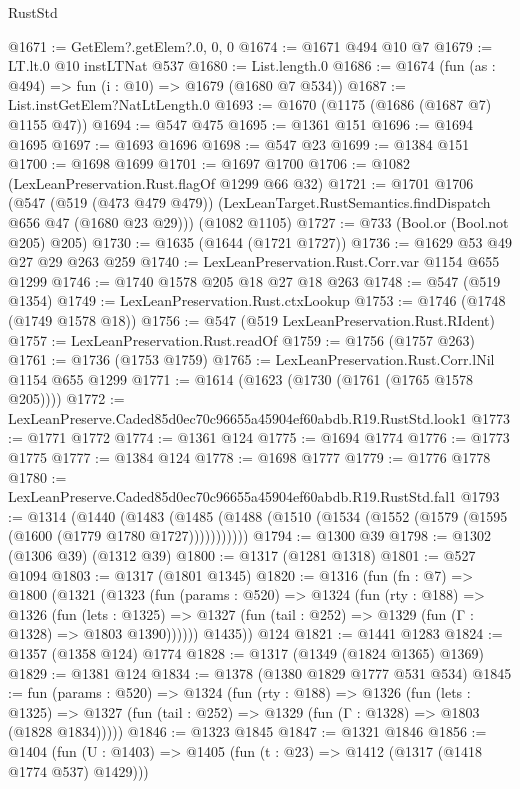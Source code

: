 \begin{lexlean}{RustStd}
\begin{coremodule}
@1671 := GetElem?.getElem?.{0, 0, 0}
@1674 := @1671 @494 @10 @7
@1679 := LT.lt.{0} @10 instLTNat @537
@1680 := List.length.{0}
@1686 := @1674 (fun (as : @494) => fun (i : @10) => @1679 (@1680 @7 @534))
@1687 := List.instGetElem?NatLtLength.{0}
@1693 := @1670 (@1175 (@1686 (@1687 @7) @1155 @47))
@1694 := @547 @475
@1695 := @1361 @151
@1696 := @1694 @1695
@1697 := @1693 @1696
@1698 := @547 @23
@1699 := @1384 @151
@1700 := @1698 @1699
@1701 := @1697 @1700
@1706 := @1082 (LexLeanPreservation.Rust.flagOf @1299 @66 @32)
@1721 := @1701
    @1706
    (@547
      (@519 (@473 @479 @479))
      (LexLeanTarget.RustSemantics.findDispatch @656 @47 (@1680 @23 @29)))
    (@1082 @1105)
@1727 := @733 (Bool.or (Bool.not @205) @205)
@1730 := @1635 (@1644 (@1721 @1727))
@1736 := @1629 @53 @49 @27 @29 @263 @259
@1740 := LexLeanPreservation.Rust.Corr.var @1154 @655 @1299
@1746 := @1740 @1578 @205 @18 @27 @18 @263
@1748 := @547 (@519 @1354)
@1749 := LexLeanPreservation.Rust.ctxLookup
@1753 := @1746 (@1748 (@1749 @1578 @18))
@1756 := @547 (@519 LexLeanPreservation.Rust.RIdent)
@1757 := LexLeanPreservation.Rust.readOf
@1759 := @1756 (@1757 @263)
@1761 := @1736 (@1753 @1759)
@1765 := LexLeanPreservation.Rust.Corr.lNil @1154 @655 @1299
@1771 := @1614 (@1623 (@1730 (@1761 (@1765 @1578 @205))))
@1772 := LexLeanPreserve.Caded85d0ec70c96655a45904ef60abdb.R19.RustStd.look1
@1773 := @1771 @1772
@1774 := @1361 @124
@1775 := @1694 @1774
@1776 := @1773 @1775
@1777 := @1384 @124
@1778 := @1698 @1777
@1779 := @1776 @1778
@1780 := LexLeanPreserve.Caded85d0ec70c96655a45904ef60abdb.R19.RustStd.fal1
@1793 := @1314
    (@1440
      (@1483 (@1485 (@1488 (@1510 (@1534 (@1552 (@1579 (@1595 (@1600 (@1779 @1780 @1727)))))))))))
@1794 := @1300 @39
@1798 := @1302 (@1306 @39) (@1312 @39)
@1800 := @1317 (@1281 @1318)
@1801 := @527 @1094
@1803 := @1317 (@1801 @1345)
@1820 := @1316
    (fun (fn : @7) =>
    @1800
      (@1321
        (@1323
          (fun (params : @520) =>
          @1324
            (fun (rty : @188) =>
            @1326
              (fun (lets : @1325) =>
              @1327 (fun (tail : @252) => @1329 (fun (Γ : @1328) => @1803 @1390))))))
        @1435))
    @124
@1821 := @1441 @1283
@1824 := @1357 (@1358 @124) @1774
@1828 := @1317 (@1349 (@1824 @1365) @1369)
@1829 := @1381 @124
@1834 := @1378 (@1380 @1829 @1777 @531 @534)
@1845 := fun (params : @520) =>
  @1324
    (fun (rty : @188) =>
    @1326
      (fun (lets : @1325) =>
      @1327 (fun (tail : @252) => @1329 (fun (Γ : @1328) => @1803 (@1828 @1834)))))
@1846 := @1323 @1845
@1847 := @1321 @1846
@1856 := @1404 (fun (U : @1403) => @1405 (fun (t : @23) => @1412 (@1317 (@1418 @1774 @537) @1429)))

\end{coremodule}
\end{lexlean}
